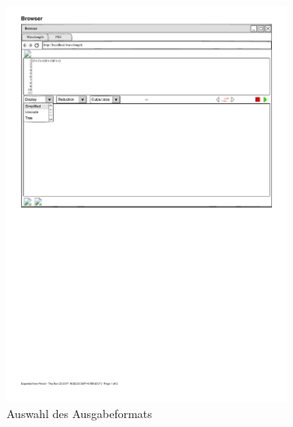 \documentclass[parskip=full,11pt,twoside]{scrartcl}
\begin{document}
\begin{figure}[H]
	\begin{subfigure}[l]{0.25\textwidth}
	\centering
		\includegraphics{img/displayMenu}
	\caption{\label{fig:display}Auswahl des Ausgabeformats}	
	\end{subfigure}
	\hspace*{\fill}
	\begin{subfigure}[m]{0.25\textwidth}
	\centering

\end{subfigure}
\end{figure}
\end{document}
